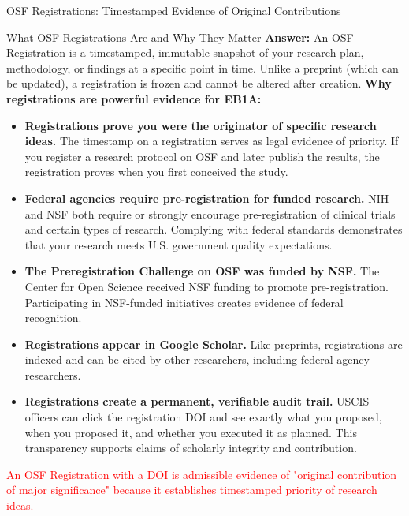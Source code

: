 \documentclass[11pt]{beamer}
\begin{document}
	\begin{frame}{OSF Registrations: Timestamped Evidence of Original Contributions}
		\scriptsize
		\begin{block}{What OSF Registrations Are and Why They Matter}
			\textbf{Answer:} An OSF Registration is a timestamped, immutable snapshot of your research plan, methodology, or findings at a specific point in time. Unlike a preprint (which can be updated), a registration is frozen and cannot be altered after creation.
			\vspace{0.1cm}
			\textbf{Why registrations are powerful evidence for EB1A:}
			\begin{itemize}
				\item \textbf{Registrations prove you were the originator of specific research ideas.} The timestamp on a registration serves as legal evidence of priority. If you register a research protocol on OSF and later publish the results, the registration proves when you first conceived the study.
				\item \textbf{Federal agencies require pre-registration for funded research.} NIH and NSF both require or strongly encourage pre-registration of clinical trials and certain types of research. Complying with federal standards demonstrates that your research meets U.S. government quality expectations.
				\item \textbf{The Preregistration Challenge on OSF was funded by NSF.} The Center for Open Science received NSF funding to promote pre-registration. Participating in NSF-funded initiatives creates evidence of federal recognition.
				\item \textbf{Registrations appear in Google Scholar.} Like preprints, registrations are indexed and can be cited by other researchers, including federal agency researchers.
				\item \textbf{Registrations create a permanent, verifiable audit trail.} USCIS officers can click the registration DOI and see exactly what you proposed, when you proposed it, and whether you executed it as planned. This transparency supports claims of scholarly integrity and contribution.
			\end{itemize}
			\textcolor{red}{An OSF Registration with a DOI is admissible evidence of "original contribution of major significance" because it establishes timestamped priority of research ideas.}
		\end{block}
	\end{frame}
	
\end{document}
